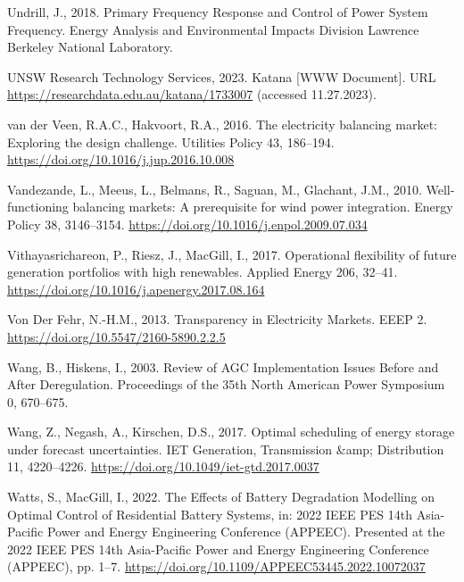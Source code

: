 \documentclass[12pt,a4paper,]{report}
\newlength{\cslhangindent}
\newenvironment{CSLReferences}[2] %
 {%
  \setlength{\parindent}{0pt}
  \ifodd #1 \everypar{\setlength{\hangindent}{\cslhangindent}}\ignorespaces\fi
  \ifnum #2 > 0
  \setlength{\parskip}{#2\baselineskip}
  \fi
 }%
 {}
\begin{document}
\begin{CSLReferences}{1}{0}
\leavevmode{}%
Undrill, J., 2018. Primary {Frequency Response} and {Control} of {Power
System Frequency}. Energy Analysis and Environmental Impacts Division
Lawrence Berkeley National Laboratory.

\leavevmode{}%
UNSW Research Technology Services, 2023. Katana {[}WWW Document{]}. URL
\url{https://researchdata.edu.au/katana/1733007} (accessed 11.27.2023).

\leavevmode{}%
van der Veen, R.A.C., Hakvoort, R.A., 2016. The electricity balancing
market: {Exploring} the design challenge. Utilities Policy 43, 186--194.
\url{https://doi.org/10.1016/j.jup.2016.10.008}

\leavevmode{}%
Vandezande, L., Meeus, L., Belmans, R., Saguan, M., Glachant, J.M.,
2010. Well-functioning balancing markets: {A} prerequisite for wind
power integration. Energy Policy 38, 3146--3154.
\url{https://doi.org/10.1016/j.enpol.2009.07.034}

\leavevmode{}%
Vithayasrichareon, P., Riesz, J., MacGill, I., 2017. Operational
flexibility of future generation portfolios with high renewables.
Applied Energy 206, 32--41.
\url{https://doi.org/10.1016/j.apenergy.2017.08.164}

\leavevmode{}%
Von Der Fehr, N.-H.M., 2013. Transparency in {Electricity Markets}. EEEP
2. \url{https://doi.org/10.5547/2160-5890.2.2.5}

\leavevmode{}%
Wang, B., Hiskens, I., 2003. Review of {AGC Implementation Issues
Before} and {After Deregulation}. Proceedings of the 35th North American
Power Symposium 0, 670--675.

\leavevmode{}%
Wang, Z., Negash, A., Kirschen, D.S., 2017. Optimal scheduling of energy
storage under forecast uncertainties. IET Generation, Transmission
\&amp; Distribution 11, 4220--4226.
\url{https://doi.org/10.1049/iet-gtd.2017.0037}

\leavevmode{}%
Watts, S., MacGill, I., 2022. The {Effects} of {Battery Degradation
Modelling} on {Optimal Control} of {Residential Battery Systems}, in:
2022 {IEEE PES} 14th {Asia-Pacific Power} and {Energy Engineering
Conference} ({APPEEC}). Presented at the 2022 {IEEE PES} 14th
{Asia-Pacific Power} and {Energy Engineering Conference} ({APPEEC}), pp.
1--7. \url{https://doi.org/10.1109/APPEEC53445.2022.10072037}


\end{CSLReferences}
\end{document}
